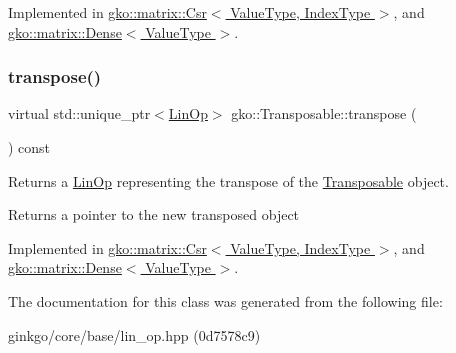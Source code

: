 Implemented in \hyperlink{classgko_1_1matrix_1_1Csr_a38820451af5424f18b767667f3067d72}{gko\+::matrix\+::\+Csr$<$ Value\+Type, Index\+Type $>$}, and \hyperlink{classgko_1_1matrix_1_1Dense_a19890b1448497a50d57c16ed4c3bd820}{gko\+::matrix\+::\+Dense$<$ Value\+Type $>$}.

\mbox{\label{classgko_1_1Transposable_a5c6b778b71b47d53e0bda6ccf894d318}} 
\subsubsection{\texorpdfstring{transpose()}{transpose()}}
{\footnotesize\ttfamily virtual std\+::unique\+\_\+ptr$<$\hyperlink{classgko_1_1LinOp}{Lin\+Op}$>$ gko\+::\+Transposable\+::transpose (\begin{DoxyParamCaption}{ }\end{DoxyParamCaption}) const\hspace{0.3cm}{\ttfamily [pure virtual]}}



Returns a \hyperlink{classgko_1_1LinOp}{Lin\+Op} representing the transpose of the \hyperlink{classgko_1_1Transposable}{Transposable} object. 

\begin{DoxyReturn}{Returns}
a pointer to the new transposed object 
\end{DoxyReturn}


Implemented in \hyperlink{classgko_1_1matrix_1_1Csr_ab79e609214d6b4834d5961ee0a7d3519}{gko\+::matrix\+::\+Csr$<$ Value\+Type, Index\+Type $>$}, and \hyperlink{classgko_1_1matrix_1_1Dense_a64ea8e876f5390a535a2ef486bd5ab9a}{gko\+::matrix\+::\+Dense$<$ Value\+Type $>$}.



The documentation for this class was generated from the following file\+:\begin{DoxyCompactItemize}
\item 
ginkgo/core/base/lin\+\_\+op.\+hpp (0d7578c9)\end{DoxyCompactItemize}
